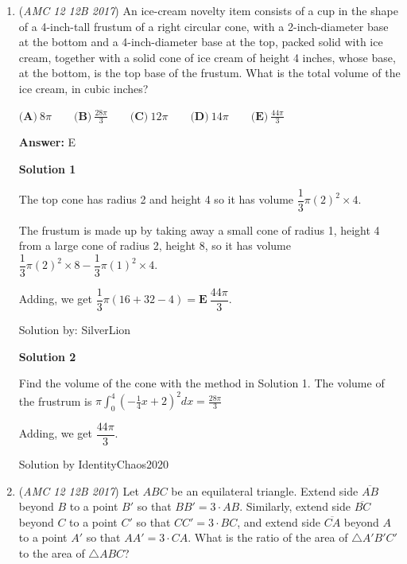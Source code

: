 \begin{enumerate}
 Solution by Aadileo

 -aashrithm

 


	\item (\textit{AMC 12 12B 2017}) An ice-cream novelty item consists of a cup in the shape of a 4-inch-tall frustum of a right circular cone, with a 2-inch-diameter base at the bottom and a 4-inch-diameter base at the top, packed solid with ice cream, together with a solid cone of ice cream of height 4 inches, whose base, at the bottom, is the top base of the frustum. What is the total volume of the ice cream, in cubic inches? 


 $\textbf{(A)}\ 8\pi \qquad \textbf{(B)}\ \frac{28\pi}{3} \qquad \textbf{(C)}\ 12\pi \qquad \textbf{(D)}\ 14\pi \qquad \textbf{(E)}\ \frac{44\pi}{3}$

 \textbf{Answer: }E



\textbf{Solution 1}

The top cone has radius 2 and height 4 so it has volume $\dfrac{1}{3} \pi (2)^2 \times 4$. 

 The frustum is made up by taking away a small cone of radius 1, height 4 from a large cone of radius 2, height 8, so it has volume$\dfrac{1}{3} \pi (2)^2 \times 8 - \dfrac{1}{3} \pi (1)^2 \times 4$.

 Adding, we get $\dfrac{1}{3} \pi (16+32-4) = \boxed{ \textbf{E} \ \dfrac{44\pi}{3}}$. 

 Solution by: SilverLion 

 



\textbf{Solution 2}

Find the volume of the cone with the method in Solution 1. The volume of the frustrum is $\pi\int_{0}^{4} \left(-\frac{1}{4}x+2\right)^2 dx=\frac{28\pi}{3}$

 Adding, we get $\dfrac{44\pi}{3}$.

 Solution by IdentityChaos2020

 


	\item (\textit{AMC 12 12B 2017}) Let $ABC$ be an equilateral triangle. Extend side $\overline{AB}$ beyond $B$ to a point $B'$ so that $BB'=3 \cdot AB$. Similarly, extend side $\overline{BC}$ beyond $C$ to a point $C'$ so that $CC'=3 \cdot BC$, and extend side $\overline{CA}$ beyond $A$ to a point $A'$ so that $AA'=3 \cdot CA$. What is the ratio of the area of $\triangle A'B'C'$ to the area of $\triangle ABC$?



\end{enumerate}
